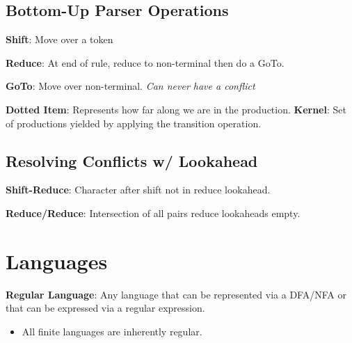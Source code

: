 \documentclass[10pt]{report}
\begin{document}
\begin{multicols}{2}
    \subsection{Bottom-Up Parser Operations}
    
    \textbf{Shift}: Move over a token
    
    \textbf{Reduce}: At end of rule, reduce to non-terminal then do a GoTo.
    
    \textbf{GoTo}: Move over non-terminal. \textit{Can never have a conflict}
    
    \textbf{Dotted Item}: Represents how far along we are in the production. \textbf{Kernel}: Set of productions yielded by applying the transition operation.
    
    \subsection{Resolving Conflicts w/ Lookahead}
    \textbf{Shift-Reduce}: Character after shift not in reduce lookahead.
    
    \textbf{Reduce/Reduce}: Intersection of all pairs reduce lookaheads empty.
    
    \section*{Languages}
    
    \noindent
    \textbf{Regular Language}: Any language that can be represented via a DFA/NFA or that can be expressed via a regular expression.
    \begin{itemize}
      \item All finite languages are inherently regular.
    \end{itemize}
    
  \end{multicols}
\end{document}
